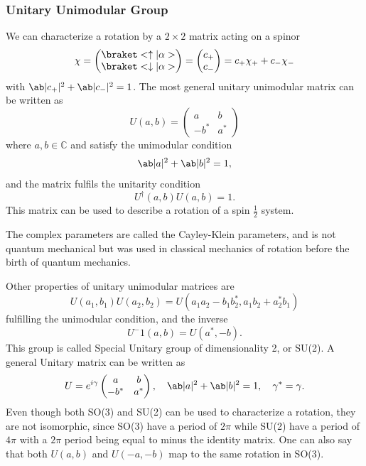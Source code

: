 \subsubsection{Unitary Unimodular Group}
We can characterize a rotation by a $2\times 2$ matrix acting on a spinor
\begin{equation}
    \chi =
        \begin{pmatrix}
            \bk{\uparrow}{\alpha}\\
            \bk{\downarrow}{\alpha}
        \end{pmatrix} 
        =
        \begin{pmatrix}
            c_+\\
            c_-
        \end{pmatrix}
        = c_+ \chi_+ + c_- \chi_-
\end{equation}
with $\abs{c_+}^2 + \abs{c_-}^2 = 1$. The most general unitary unimodular matrix can be written as 
\begin{equation}
    U(a,b) = 
        \begin{pmatrix}
            a & b\\
            -b^* & a^*
        \end{pmatrix}
\end{equation}
where $a,b \in \mathbb{C}$ and satisfy the unimodular condition 
\begin{equation}
    \abs{a}^2 + \abs{b}^2 = 1,
\end{equation}
and the matrix fulfils the unitarity condition
\begin{equation}
    U^\dagger(a,b)U(a,b) = 1.
\end{equation}
This matrix can be used to describe a rotation of a spin $\frac{1}{2}$ system.

The complex parameters are called the Cayley-Klein parameters, and is not quantum mechanical but was used in classical mechanics of rotation before the birth of quantum mechanics.

Other properties of unitary unimodular matrices are 
\begin{equation}
    U(a_1,b_1)U(a_2,b_2) = U(a_1a_2 - b_1b_2^*, a_1b_2 + a_2^*b_1)
\end{equation}
fulfilling the unimodular condition, and the inverse
\begin{equation}
    U^-1(a,b) = U(a^*, -b).
\end{equation}
This group is called Special Unitary group of dimensionality 2, or SU(2). A general Unitary matrix can be written as 
\begin{equation}
    U = e^{i\gamma}
        \begin{pmatrix}
            a & b\\
            -b^* & a^*
        \end{pmatrix}
        , \quad \abs{a}^2 + \abs{b}^2 = 1, \quad \gamma^* = \gamma.
\end{equation}
Even though both SO(3) and SU(2) can be used to characterize a rotation, they are not isomorphic, since SO(3) have a period of $2\pi$ while SU(2) have a period of $4\pi$ with a $2\pi$ period being equal to minus the identity matrix. One can also say that both $U(a,b)$ and $U(-a,-b)$ map to the same rotation in SO(3).

